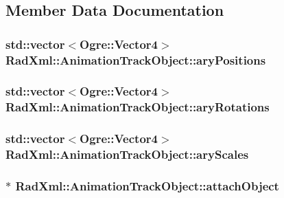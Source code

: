 \subsection{Member Data Documentation}
\hypertarget{class_rad_xml_1_1_animation_track_object_af4e33dce343bd962dbdf3344de3b50ce}{
\subsubsection[{ary\-Positions}]{\setlength{\rightskip}{0pt plus 5cm}std\-::vector$<$Ogre\-::\-Vector4$>$ Rad\-Xml\-::\-Animation\-Track\-Object\-::ary\-Positions}}\label{class_rad_xml_1_1_animation_track_object_af4e33dce343bd962dbdf3344de3b50ce}
\hypertarget{class_rad_xml_1_1_animation_track_object_a3e961c717902d1dfe651c6fe2f74b347}{
\subsubsection[{ary\-Rotations}]{\setlength{\rightskip}{0pt plus 5cm}std\-::vector$<$Ogre\-::\-Vector4$>$ Rad\-Xml\-::\-Animation\-Track\-Object\-::ary\-Rotations}}\label{class_rad_xml_1_1_animation_track_object_a3e961c717902d1dfe651c6fe2f74b347}
\hypertarget{class_rad_xml_1_1_animation_track_object_a1a33ddc98a8c0ab877076d5521821dd3}{
\subsubsection[{ary\-Scales}]{\setlength{\rightskip}{0pt plus 5cm}std\-::vector$<$Ogre\-::\-Vector4$>$ Rad\-Xml\-::\-Animation\-Track\-Object\-::ary\-Scales}}\label{class_rad_xml_1_1_animation_track_object_a1a33ddc98a8c0ab877076d5521821dd3}
\hypertarget{class_rad_xml_1_1_animation_track_object_a06369b63f2ae38e18f63f0cca4421398}{
\subsubsection[{attach\-Object}]{$\ast$ Rad\-Xml\-::\-Animation\-Track\-Object\-::attach\-Object}}\label{class_rad_xml_1_1_animation_track_object_a06369b63f2ae38e18f63f0cca4421398}
